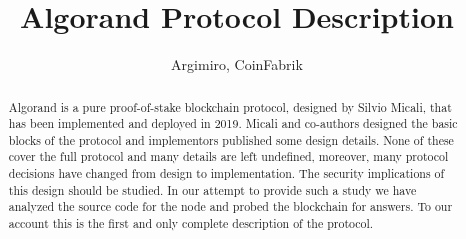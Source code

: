 \documentclass[10pt,a4paper]{article}
\begin{document}
\author{Argimiro, CoinFabrik}
\title{Algorand Protocol Description}

\maketitle
\tableofcontents


\begin{abstract}
    Algorand is a pure proof-of-stake blockchain protocol, designed by Silvio Micali,
    that has been implemented and deployed in 2019. Micali and co-authors designed 
    the basic blocks of the protocol and implementors published some design details.
    None of these cover the full protocol and many details are left undefined, moreover,
    many protocol decisions have changed from design to implementation. The security
    implications of this design should be studied. In our attempt to provide such a 
    study we have analyzed the source code for the node and probed the blockchain for 
    answers. To our account this is the first and only complete description of the 
    protocol. 
\end{abstract}
\end{document}
